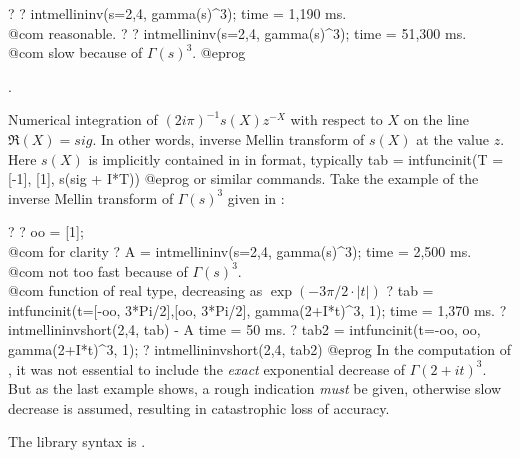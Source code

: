 \bprog
? 
? intmellininv(s=2,4, gamma(s)^3);
time = 1,190 ms. \\@com reasonable.
? 
? intmellininv(s=2,4, gamma(s)^3);
time = 51,300 ms. \\@com slow because of $\Gamma(s)^3$.
@eprog\noindent

.

\label{se:intmellininvshort}
Numerical integration
of $(2i\pi)^{-1}s(X)z^{-X}$ with respect to $X$ on the line $\Re(X)=sig$.
In other words, inverse Mellin transform of $s(X)$ at the value $z$.
Here $s(X)$ is implicitly contained in  in  format,
typically
\bprog
tab = intfuncinit(T = [-1], [1], s(sig + I*T))
@eprog\noindent
or similar commands. Take the example of the inverse Mellin transform of
$\Gamma(s)^3$ given in :

\bprog
? 
? oo = [1]; \\@com for clarity
? A = intmellininv(s=2,4, gamma(s)^3);
time = 2,500 ms. \\@com not too fast because of $\Gamma(s)^3$.
\\ @com function of real type, decreasing as $\exp(-3\pi/2\cdot |t|)$
? tab = intfuncinit(t=[-oo, 3*Pi/2],[oo, 3*Pi/2], gamma(2+I*t)^3, 1);
time = 1,370 ms.
? intmellininvshort(2,4, tab) - A
time = 50 ms.
? tab2 = intfuncinit(t=-oo, oo, gamma(2+I*t)^3, 1);
? intmellininvshort(2,4, tab2)
@eprog\noindent
In the computation of , it was not essential to include the
\emph{exact} exponential decrease of $\Gamma(2+it)^3$. But as the last
example shows, a rough indication \emph{must} be given, otherwise slow
decrease is assumed, resulting in catastrophic loss of accuracy.

The library syntax is .

